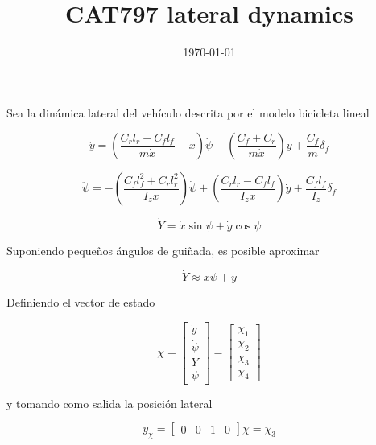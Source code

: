 \documentclass{article}
\title{CAT797 lateral dynamics}
\date{\today}
\begin{document}
\maketitle

Sea la dinámica lateral del vehículo descrita por el modelo bicicleta lineal

\begin{equation}
\ddot{y}
=
\left(
\frac{C_r l_r - C_f l_f}{m \dot{x}}
-
\dot{x}
\right)\dot{\psi}
-
\left(
\frac{C_f + C_r}{m \dot{x}}
\right)\dot{y}
+
\frac{C_f}{m}\delta_f
\label{eq:lateral_dynamics}
\end{equation}

\begin{equation}
\ddot{\psi}
=
-
\left(
\frac{C_f l_f^2 + C_r l_r^2}{I_z \dot{x}}
\right)\dot{\psi}
+
\left(
\frac{C_r l_r - C_f l_f}{I_z \dot{x}}
\right)\dot{y}
+
\frac{C_f l_f}{I_z}\delta_f
\label{eq:yaw_dynamics}
\end{equation}

\begin{equation}
\dot{Y}
=
\dot{x}\sin\psi+\dot{y}\cos\psi
\end{equation}

Suponiendo pequeños ángulos de guiñada, es posible aproximar

\begin{equation}
\dot{Y}
\approx
\dot{x}\psi+\dot{y}
\label{eq:Ydot}
\end{equation}

Definiendo el vector de estado

\begin{equation}
\chi=
\begin{bmatrix}
\dot{y}\\
\dot{\psi}\\
Y\\ \psi
\end{bmatrix}
=
\begin{bmatrix}
\chi_1\\
\chi_2\\
\chi_3\\ \chi_4
\end{bmatrix}
\end{equation}

y tomando como salida la posición lateral

\begin{equation}
y_\chi=
\begin{bmatrix}
0 & 0 & 1 & 0
\end{bmatrix}
\chi
=
\chi_3
\end{equation}
\end{document}
